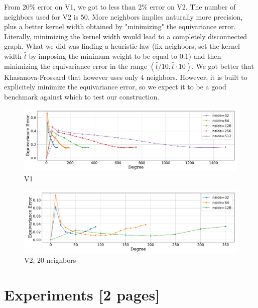 \documentclass{article} %
\newcommand{\mart}[1]{{\color[rgb]{.9,.5,.3}{#1}}}
\begin{document}
From 20\% error on V1, we got to less than 2\% error on V2. The number of neighbors used for V2 is $50$. More neighbors implies naturally more precision, plus a better kernel width obtained by "minimizing" the equivariance error. \mart{How to explain how we found the kernel width? Micha\"el I need your help here!!} Literally, minimizing the kernel width would lead to a completely disconnected graph. What we did was finding a heuristic law (fix neighbors, set the kernel width $\hat t$ by imposing the minimum weight to be equal to $0.1$) and then minimizing the equivariance error in the range $(\hat t / 10, \hat t\cdot 10) $. We got better that Khasanova-Frossard \mart{(check the code)} that however uses only 4 neighbors. However, it is built to explicitely minimize the equivariance error, so we expect it to be a good benchmark against which to test our construction.
\begin{figure}
	\centering
	\includegraphics[width=0.9\linewidth]{V1.pdf}
	\caption{V1}
	\label{fig:deepsphereV1}
\end{figure}

\begin{figure}
	\centering
	\includegraphics[width=0.9\linewidth]{V2.pdf}
	\caption{V2, 20 neighbors}
	\label{fig:deepsphereV2}
\end{figure}



\section{Experiments [2 pages]}

\end{document}
